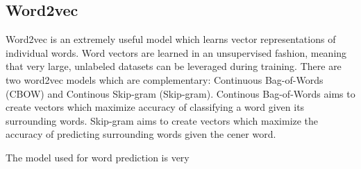 \subsection{Word2vec}
Word2vec is an extremely useful model which learns vector representations of individual words.  Word vectors are learned in an unsupervised fashion, meaning that very large, unlabeled datasets can be leveraged during training.  There are two word2vec models which are complementary:  Continuous Bag-of-Words (CBOW) and Continous Skip-gram (Skip-gram).  Continous Bag-of-Words aims to create vectors which maximize accuracy of classifying a word given its surrounding words.  Skip-gram aims to create vectors which maximize the accuracy of predicting surrounding words given the cener word.

The model used for word prediction is very


